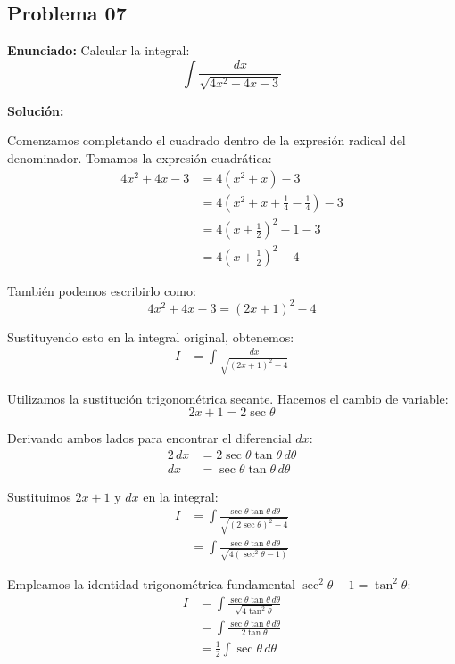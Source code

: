 \subsection*{Problema 07}

\textbf{Enunciado:} Calcular la integral:
\begin{equation*}
  \int \frac{dx}{\sqrt{4x^2 + 4x - 3}}
\end{equation*}

\textbf{Solución:} 

Comenzamos completando el cuadrado 
dentro de la expresión radical del 
denominador. Tomamos la expresión 
cuadrática:
\begin{align*}
  4x^2 + 4x - 3 &= 4(x^2 + x) - 3 \\
  &= 4\left(x^2 + x + \frac{1}{4} - \frac{1}{4}\right) - 3 \\
  &= 4\left(x + \frac{1}{2}\right)^2 - 1 - 3 \\
  &= 4\left(x + \frac{1}{2}\right)^2 - 4
\end{align*}

También podemos escribirlo como:
\begin{equation*}
  4x^2 + 4x - 3 = (2x + 1)^2 - 4
\end{equation*}

Sustituyendo esto en la integral 
original, obtenemos:
\begin{align*}
  I &= \int \frac{dx}{\sqrt{(2x + 1)^2 - 4}}
\end{align*}

Utilizamos la sustitución 
trigonométrica secante. 
Hacemos el cambio de variable:
\begin{equation*}
  2x + 1 = 2\sec\theta
\end{equation*}

Derivando ambos lados para 
encontrar el diferencial $dx$:
\begin{align*}
  2\,dx &= 2\sec\theta\tan\theta\,d\theta \\
  dx &= \sec\theta\tan\theta\,d\theta
\end{align*}

Sustituimos $2x + 1$ y $dx$ 
en la integral:
\begin{align*}
  I &= \int \frac{\sec\theta\tan\theta\,d\theta}{\sqrt{(2\sec\theta)^2 - 4}} \\
  &= \int \frac{\sec\theta\tan\theta\,d\theta}{\sqrt{4(\sec^2\theta - 1)}}
\end{align*}

Empleamos la identidad trigonométrica 
fundamental $\sec^2\theta - 1 = \tan^2\theta$:
\begin{align*}
  I &= \int \frac{\sec\theta\tan\theta\,d\theta}{\sqrt{4\tan^2\theta}} \\
  &= \int \frac{\sec\theta\tan\theta\,d\theta}{2\tan\theta} \\
  &= \frac{1}{2}\int \sec\theta\,d\theta
\end{align*}

